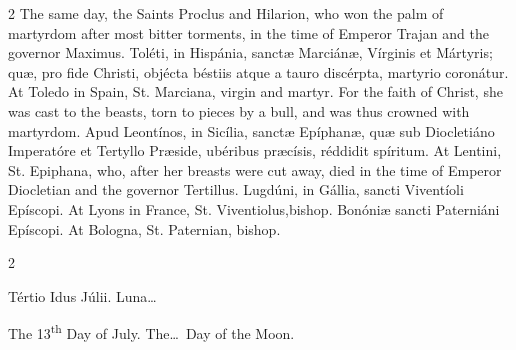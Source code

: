 \begin{paracol}{2}
\switchcolumn
{}
The same day, the Saints Proclus and 
 Hilarion, who won the palm of martyrdom after most bitter torments, in the 
 time of Emperor Trajan and the governor Maximus.
\switchcolumn*
{}
Toléti, in Hispánia, 
 sanctæ Marciánæ, Vírginis et Mártyris; quæ, pro fide Christi, objécta 
 béstiis atque a tauro discérpta, martyrio coronátur.
\switchcolumn
{}
At Toledo in Spain, St. Marciana, 
 virgin and martyr. For the faith of Christ, she was cast to the 
 beasts, torn to pieces by a bull, and was thus crowned with martyrdom.
\switchcolumn*
{}
Apud Leontínos, in 
 Sicília, sanctæ Epíphanæ, quæ sub Diocletiáno Imperatóre et Tertyllo Præside, 
 ubéribus præcísis, réddidit spíritum.
\switchcolumn
{}
At Lentini, St. Epiphana, who, after 
 her breasts were cut away, died in the time of Emperor Diocletian and the 
 governor Tertillus.
\switchcolumn*
{}
Lugdúni, in Gállia, 
 sancti Viventíoli Epíscopi.
\switchcolumn
{}
At Lyons in France, St. Viventiolus,bishop.
\switchcolumn*
{}
Bonóniæ sancti 
 Paterniáni Epíscopi.
\switchcolumn
{}
At Bologna, St. Paternian, bishop.
\switchcolumn*
{}
\end{paracol}


\begin{paracol}{2}
\begin{center}{\color{gregoriocolor} Tértio Idus Júlii. 
 Luna\dots\ }\end{center}
\switchcolumn
{}
\begin{center}{\color{gregoriocolor} The 
 13\textsuperscript{th} Day of 
 July. The\dots\ Day of the Moon.}\end{center}
\end{paracol}

